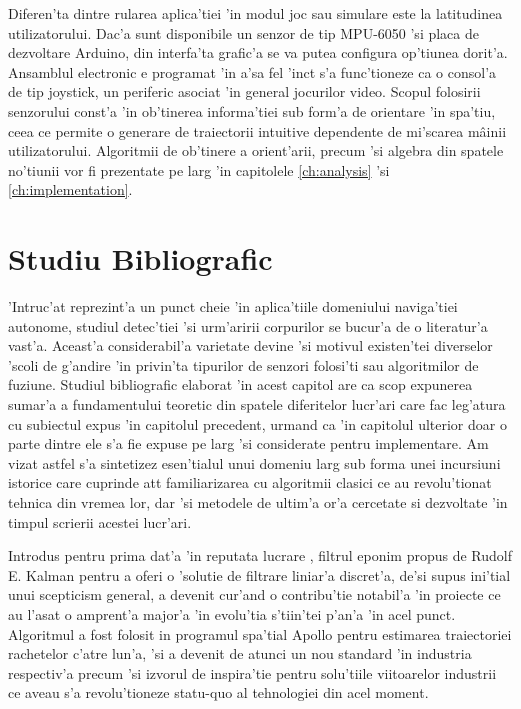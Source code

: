 \documentclass[12pt,a4paper,twoside]{report}
\begin{document}
\vspace{5px}

Diferen'ta dintre rularea aplica'tiei 'in modul joc sau simulare este la latitudinea utilizatorului. Dac'a sunt disponibile un senzor de tip MPU-6050 'si placa de dezvoltare Arduino, din interfa'ta grafic'a se va putea configura op'tiunea dorit'a. Ansamblul electronic e programat 'in a'sa fel 'inc\ia t s'a func'tioneze ca o consol'a de tip joystick, un periferic asociat 'in general jocurilor video. Scopul folosirii senzorului const'a 'in ob'tinerea informa'tiei sub form'a de orientare 'in spa'tiu, ceea ce permite o generare de traiectorii intuitive dependente de mi'scarea m\^{a}inii utilizatorului. Algoritmii de ob'tinere a orient'arii, precum 'si algebra din spatele no'tiunii vor fi prezentate pe larg 'in capitolele \ref{ch:analysis} 'si \ref{ch:implementation}.



\chapter{Studiu Bibliografic}

'Intruc'at reprezint'a un punct cheie 'in aplica'tiile domeniului naviga'tiei autonome, studiul detec'tiei 'si urm'aririi corpurilor se bucur'a de o literatur'a vast'a. Aceast'a considerabil'a varietate devine 'si motivul existen'tei diverselor 'scoli de g'andire 'in privin'ta tipurilor de senzori folosi'ti sau algoritmilor de fuziune. Studiul bibliografic elaborat 'in acest capitol are ca scop expunerea sumar'a a fundamentului teoretic din spatele diferitelor lucr'ari care fac leg'atura cu subiectul expus 'in capitolul precedent, urm\ia and ca 'in capitolul ulterior doar o parte dintre ele s'a fie expuse pe larg 'si considerate pentru implementare. Am vizat astfel s'a sintetizez esen'tialul unui domeniu larg sub forma unei incursiuni istorice care cuprinde at\ia t familiarizarea cu algoritmii clasici ce au revolu'tionat tehnica din vremea lor, dar 'si metodele de ultim'a or'a cercetate si dezvoltate 'in timpul scrierii acestei lucr'ari.

\vspace{5px}

Introdus pentru prima dat'a 'in reputata lucrare \cite{10.1115/1.3662552}, filtrul eponim propus de Rudolf E. Kalman pentru a oferi o 'solutie de filtrare liniar'a discret'a, de'si supus ini'tial unui scepticism general, a devenit cur'and o contribu'tie notabil'a 'in proiecte ce au l'asat o amprent'a major'a 'in evolu'tia s'tiin'tei p'an'a 'in acel punct. Algoritmul a fost folosit in programul spa'tial Apollo \cite{5466132} pentru estimarea traiectoriei rachetelor c'atre lun'a, 'si a devenit de atunci un nou standard 'in industria respectiv'a precum 'si izvorul de inspira'tie pentru solu'tiile viitoarelor industrii ce aveau s'a revolu'tioneze statu-quo al tehnologiei din acel moment.
\end{document}
